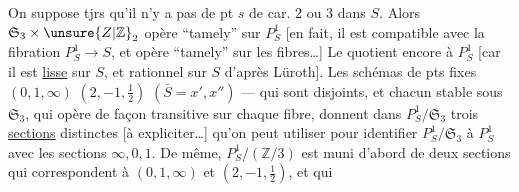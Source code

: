 
On suppose tjrs qu'il n'y a pas de pt $s$ de car. 2 ou 3 dans $S$. Alors  $\mathfrak S_3\times \unsure{Z|\mathbb Z}_2$ opère ``tamely'' sur $P^1_S$ [en fait, il est compatible avec la fibration $P^1_S\to S$, et opère ``tamely'' sur les fibres\ldots] Le quotient    encore à $P^1_S$ [car il est \uline{lisse} sur $S$, et rationnel sur $S$ d'après Lüroth]. Les schémas de pts fixes $(0,1,\infty)$ $(2,-1,\tfrac12)$ $(\bar S=x',x'')$ --- qui sont disjoints, et chacun stable sous $\mathfrak S_3$, qui   opère de façon  transitive sur chaque fibre, donnent dans $P^1_S/\mathfrak S_3$ trois \uline{sections} distinctes [à expliciter\ldots] qu'on peut utiliser pour identifier $P^1_S/\mathfrak S_3$ à $P^1_S$ avec les sections $\infty,0,1$. De même,  $P^1_S/(\mathbb Z/3)$ est muni d'abord de deux sections qui correspondent à $(0,1,\infty)$ et $(2,-1,\tfrac12)$, et qui
